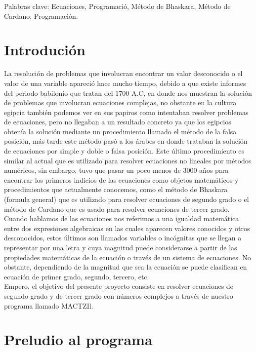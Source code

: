 \documentclass[12pt,letterpaper]{article}
\begin{document}
\noindent Palabras clave: Ecuaciones, Programació, Método de Bhaskara, Método de Cardano, Programación.
\section{Introdución}

\noindent La resolución de problemas que involucran encontrar un valor desconocido o el valor de una variable apareció hace mucho tiempo, debido a que existe informes del periodo babilonio que tratan del 1700 A.C, en donde nos muestran la solución de problemas que involucran ecuaciones complejas, no obstante en la cultura egipcia también podemos ver en sus papiros como intentaban resolver problemas de ecuaciones, pero no llegaban a un resultado concreto ya que los egipcios obtenía la solución mediante un procedimiento llamado el método de la falsa posición, más tarde este método pasó a los árabes en donde trataban la solución de ecuaciones por simple y doble o falsa posición. Este último procedimiento es similar al actual que es utilizado para resolver ecuaciones no lineales por métodos numéricos, sin embargo, tuvo que pasar un poco menos de 3000 años para encontrar los primeros indicios de las ecuaciones como objetos matemáticos y procedimientos que actualmente conocemos, como el método de Bhaskara (formula general) que es utilizado para resolver ecuaciones de segundo grado o el método de Cardano que es usado para resolver ecuaciones de tercer grado.
\\

\noindent Cuando hablamos de las ecuaciones nos referimos a una igualdad matemática entre dos expresiones algebraicas en las cuales aparecen valores conocidos y otros desconocidos, estos últimos son llamados variables o incógnitas que se llegan a representar por una letra y cuya magnitud puede considerarse a partir de las propiedades matemáticas de la ecuación o través de un sistema de ecuaciones. No obstante, dependiendo de la magnitud que sea la ecuación se puede clasifican en ecuación de primer grado, segundo, tercero, etc. 
\\

\noindent Empero, el objetivo del presente proyecto consiste en resolver ecuaciones de segundo grado y de tercer grado con números complejos a través de nuestro programa llamado MACTZIl. 

\section{Preludio al programa}
\end{document}
